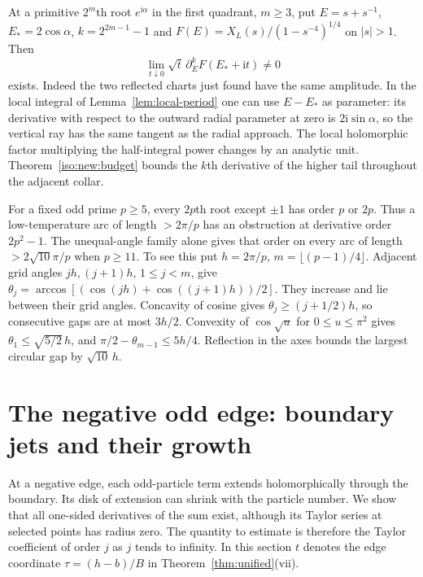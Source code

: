 \documentclass[11pt]{article}
\numberwithin{equation}{section}
\theoremstyle{definition}
\newcommand{\ii}{\mathrm i}
\begin{document}
At a primitive $2^m$th root $e^{\ii\alpha}$ in the first quadrant,
$m\ge3$, put $E=s+s^{-1}$, $E_*=2\cos\alpha$, $k=2^{2m-1}-1$ and
$F(E)=X_L(s)/(1-s^{-4})^{1/4}$ on $|s|>1$. Then
\[
 \lim_{t\downarrow0}\sqrt t\,\partial_E^k F(E_*+\ii t)\ne0
\]
exists. Indeed the two reflected charts just found have the same
amplitude. In the local integral of Lemma~\ref{lem:local-period} one
can use $E-E_*$ as parameter: its derivative with respect to the
outward radial parameter at zero is $2\ii\sin\alpha$, so the vertical
ray has the same tangent as the radial approach. The local holomorphic
factor multiplying the half-integral power changes by an analytic unit.
Theorem~\ref{iso:new:budget} bounds the $k$th derivative of the higher
tail throughout the adjacent collar.

For a fixed odd prime $p\ge5$, every $2p$th root except $\pm1$ has
order $p$ or $2p$. Thus a low-temperature arc of length $>2\pi/p$
has an obstruction at derivative order $2p^2-1$. The unequal-angle
family alone gives that order on every arc of length $>2\sqrt{10}\pi/p$
when $p\ge11$. To see this put $h=2\pi/p$, $m=\lfloor(p-1)/4\rfloor$.
Adjacent grid angles $jh,(j+1)h$, $1\le j<m$, give
$\theta_j=\arccos[(\cos(jh)+\cos((j+1)h))/2]$. They increase and
lie between their grid angles. Concavity of cosine gives
$\theta_j\ge(j+1/2)h$, so consecutive gaps are at most $3h/2$.
Convexity of $\cos\sqrt u$ for $0\le u\le\pi^2$ gives
$\theta_1\le\sqrt{5/2}\,h$, and
$\pi/2-\theta_{m-1}\le5h/4$. Reflection in the axes bounds the
largest circular gap by $\sqrt{10}\,h$.

\section{The negative odd edge: boundary jets and their growth}
\label{neg:new:section}

At a negative edge, each odd-particle term extends holomorphically
through the boundary. Its disk of extension can shrink with the
particle number. We show that all one-sided derivatives of the sum
exist, although its Taylor series at selected points has radius zero.
The quantity to estimate is therefore the Taylor coefficient of
order $j$ as $j$ tends to infinity. In this section $t$ denotes the
edge coordinate $\tau=(h-b)/B$ in Theorem~\ref{thm:unified}(vii).
\end{document}
